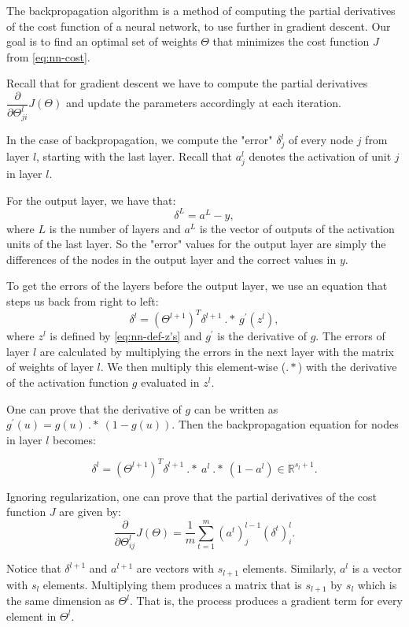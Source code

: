 \documentclass[a4paper,11pt]{report}
\begin{document}
The backpropagation algorithm is a method of computing the partial derivatives of the cost function of a neural network, to use further in gradient descent. Our goal is to find an optimal set of weights $\Theta$ that minimizes the cost function $J$ from \eqref{eq:nn-cost}.

Recall that for gradient descent we have to compute the partial derivatives $\dfrac{\partial}{\partial\Theta^l_{ji}}J(\Theta)$ and update the parameters accordingly at each iteration.

In the case of backpropagation, we compute the "error" $\delta_j^{l}$ of every node $j$ from layer $l$, starting with the last layer. Recall that $a_j^l$ denotes the activation of unit $j$ in layer $l$.

For the output layer, we have that: $$\delta^{L} = a^{L} - y,$$
where $L$ is the number of layers and $a^{L}$ is the vector of outputs of the activation units of the last layer. So the "error" values for the output layer are simply the differences of the nodes in the output layer and the correct values in $y$.

To get the errors of the layers before the output layer, we use an equation that steps us back from right to left: 
$$\delta^{l} = (\Theta^{l+1})^T \delta^{l+1}\ .*\ g^\prime(z^{l}),$$
where $z^l$ is defined by \eqref{eq:nn-def-z's} and $g^\prime$ is the derivative of $g$.
The errors of layer $l$ are calculated by multiplying the errors in the next layer with the matrix of weights of layer $l$. We then multiply this element-wise ($.*$) with the derivative of the activation function $g$ evaluated in $z^l$.

One can prove that the derivative of $g$ can be written as $g^\prime(u) = g(u)\ .*\ (1 - g(u))$. Then the backpropagation equation for nodes in layer $l$ becomes:

\begin{equation}\label{eq:nn-bkprp-eq}
\delta^{l} = (\Theta^{l+1})^T \delta^{l+1}\ .*\ a^{l}\ .*\ (1 - a^{l})\in \mathbb{R}^{s_l+1}.
\end{equation}

Ignoring regularization, one can prove that the partial derivatives of the cost function $J$ are given by:
\begin{equation}\label{eq:nn-cost-deriv}
\dfrac{\partial}{\partial \Theta_{ij}^{l}}{J(\Theta)} = \dfrac{1}{m}\sum_{t=1}^m (a^t)_j^{l-1} (\delta^t)_i^{l}.
\end{equation}

Notice that $\delta^{l+1}$  and $a^{l+1}$ are vectors with $s_{l+1}$ elements. Similarly, $a^{l}$ is a vector with $s_l$ elements. Multiplying them produces a matrix that is $s_{l+1}$ by $s_l$ which is the same dimension as $\Theta^l$. That is, the process produces a gradient term for every element in $\Theta^l$.
\end{document}
